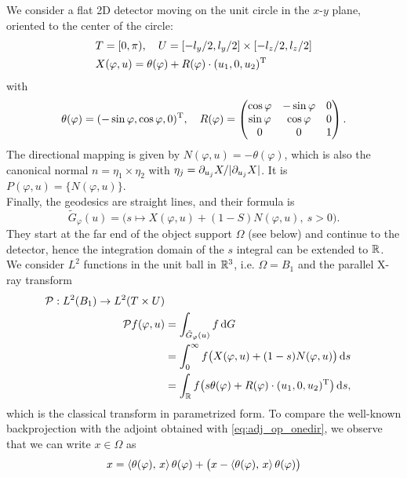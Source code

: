 \documentclass{amsart}
\renewcommand*{\phi}{\varphi}
\begin{document}
\begin{example}
 We consider a flat 2D detector moving on the unit circle in the $x$-$y$ plane, oriented to the center of the circle:
 \begin{align*}
  & T = [0, \pi),\quad U = [-l_y/2, l_y/2] \times [-l_z/2, l_z/2] \\
  & X(\phi, u) = \theta(\phi) + R(\phi) \cdot \TRANSP{(u_1, 0, u_2)}
 \end{align*}
 with
 \begin{equation}
  \theta(\phi) = \TRANSP{(-\sin\phi, \cos\phi, 0)},\quad R(\phi) =
  \begin{pmatrix}
   \cos\phi & -\sin\phi & 0 \\
   \sin\phi & \cos\phi & 0 \\
   0 & 0 & 1
  \end{pmatrix}.
 \end{equation}
 The directional mapping is given by $N(\phi, u) = -\theta(\phi)$, which is also the canonical normal $n = \eta_1 \times \eta_2$ with
 $\eta_j = \partial_{u_j} X / |\partial_{u_j} X|$. It is $P(\phi, u) = \lbrace N(\phi, u)\rbrace$.\\
 Finally, the geodesics are straight lines, and their formula is
 \begin{equation*}
  \tilde G_\phi(u) = \big( s \mapsto X(\phi, u) + (1-S) N(\phi, u),\ s > 0 \big).
 \end{equation*}
 They start at the far end of the object support $\Omega$ (see below) and continue to the detector, hence the integration domain of the $s$ 
 integral can be extended to ${\mathbb{R}}$.\\[1ex]
 We consider $L^2$ functions in the unit ball in ${\mathbb{R}}^3$, i.e. $\Omega = B_1$ and the parallel X-ray transform
 \begin{align*}
  \OPP: L^2(B_1) \to L^2(T \times U) \\
  \OPP f(\phi, u) 
  &= \int_{\tilde G_\phi(u)} f\, \D G \\
  &= \int_0^\infty f\big(X(\phi, u) + (1-s) N(\phi, u)\big)\, \D s \\
  &= \int_\RR f\big(s \theta(\phi) + R(\phi) \cdot \TRANSP{(u_1, 0, u_2)}\big)\, \D s,
 \end{align*}
 which is the classical transform in parametrized form.
 To compare the well-known backprojection with the adjoint obtained with \eqref{eq:adj_op_onedir}, we observe that we can write $x \in 
 \Omega$ as
 \begin{align*}
  x 
  &= \INNER{\theta(\phi)}{x}\, \theta(\phi) + \big(x - \INNER{\theta(\phi)}{x}\, \theta(\phi)\big) \\

\end{align*}
\end{example}
\end{document}
